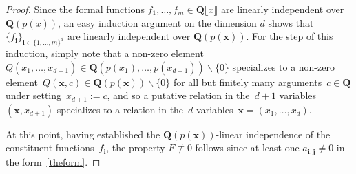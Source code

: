 \documentclass[10pt]{amsart}
\renewcommand\setminus{\smallsetminus}
\def\Q{\mathbf{Q}}
\def\bi{\mathbf{i}}
\def\bx{\mathbf{x}}
\theoremstyle{remark}
\numberwithin{equation}{subsection}
\begin{document}
\begin{proof}
Since the formal functions $f_1, \ldots, f_m \in \Q\llbracket x\rrbracket$ are linearly independent over $\Q(p(x))$, an easy induction argument on the dimension $d$ shows that $\{f_\bi\}_{\bi \in \{1, \ldots, m\}^d}$ are linearly independent over $\Q(p(\bx))$. For the step of this induction, simply note that a non-zero element $Q(x_1,\ldots,x_{d+1}) \in \Q(p(x_1),\ldots,p(x_{d+1})) \setminus \{0\}$ specializes to a non-zero element~$Q(\bx,c) \in \Q(p(\bx)) \setminus \{0\}$ for all but finitely many arguments~$c \in \Q$ under setting~$x_{d+1} := c$, and so a putative relation in the~$d+1$ variables~$(\bx, x_{d+1})$ specializes to a relation in the~$d$ variables~$\bx = (x_1,\ldots,x_d)$. 

At this point, having established the $\Q(p(\bx))$-linear independence of the constituent functions~$f_{\bi}$, the property $F \not\equiv 0$ follows since at least one $a_{\mathbf{i,j}} \neq 0$ in the form~\eqref{theform}. 
\end{proof}
\end{document}
